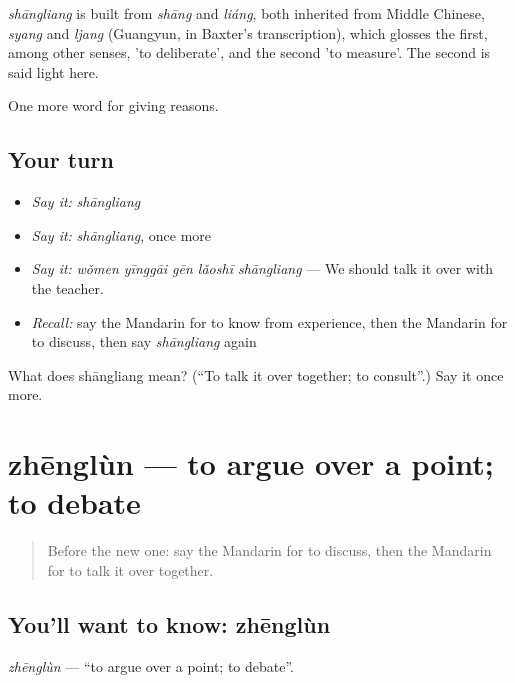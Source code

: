 \begin{cousinweb}
\emph{shāngliang} is built from \emph{shāng} and \emph{liáng}, both inherited from Middle Chinese, \emph{syang} and \emph{ljang} (Guangyun, in Baxter's transcription), which glosses the first, among other senses, 'to deliberate', and the second 'to measure'. The second is said light here.
\end{cousinweb}

\begin{grammarlens}[title={What you've built}]
One more word for giving reasons.
\end{grammarlens}

\subsection*{Your turn}
\begin{itemize}
\raggedright
  \item \emph{Say it:} \emph{shāngliang}
  \item \emph{Say it:} \emph{shāngliang}, once more
  \item \emph{Say it:} \emph{wǒmen yīnggāi gēn lǎoshī shāngliang} — We should talk it over with the teacher.
  \item \emph{Recall:} say the Mandarin for to know from experience, then the Mandarin for to discuss, then say \emph{shāngliang} again
\end{itemize}

\begin{tcolorbox}[breakable,colback=teal!4,colframe=teal!35!black,title={Before you move on}]
What does shāngliang mean? (\textquotedblleft{}To talk it over together; to consult\textquotedblright{}.) Say it once more.
\end{tcolorbox}
\section[zhēnglùn]{zhēnglùn — to argue over a point; to debate}

\label{lesson:ZH-C348-zhenglun}



\begin{quote}
Before the new one: say the Mandarin for to discuss, then the Mandarin for to talk it over together.
\end{quote}

\subsection*{You'll want to know: zhēnglùn}
\emph{zhēnglùn} — \textquotedblleft{}to argue over a point; to debate\textquotedblright{}.

